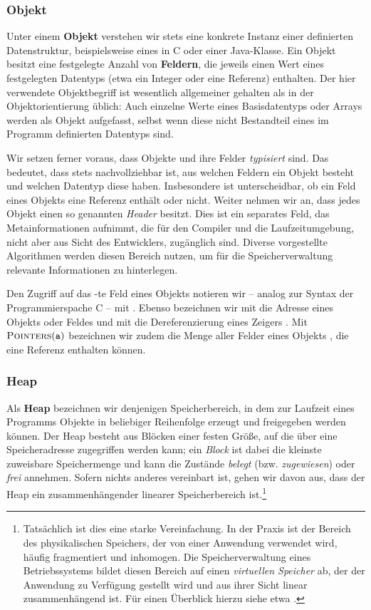 \subsubsection*{Objekt}
Unter einem \textbf{Objekt} verstehen wir stets eine konkrete Instanz einer definierten Datenstruktur, beispielsweise eines  in C oder einer Java-Klasse.
Ein Objekt besitzt eine festgelegte Anzahl von \textbf{Feldern}, die jeweils einen Wert eines festgelegten
Datentyps (etwa ein Integer oder eine Referenz) enthalten.
Der hier verwendete Objektbegriff ist wesentlich allgemeiner gehalten als in der Objektorientierung üblich:
Auch einzelne Werte eines Basisdatentyps oder Arrays werden als Objekt aufgefasst, selbst wenn diese nicht Bestandteil eines im Programm definierten Datentyps sind.

Wir setzen ferner voraus, dass Objekte und ihre Felder \textit{typisiert} sind.
Das bedeutet, dass stets nachvollziehbar ist, aus welchen Feldern ein Objekt besteht und welchen Datentyp diese haben.
Insbesondere ist unterscheidbar, ob ein Feld eines Objekts eine Referenz enthält oder nicht.
Weiter nehmen wir an, dass jedes Objekt einen so genannten \textit{Header} besitzt.
Dies ist ein separates Feld, das Metainformationen aufnimmt, die für den Compiler und die Laufzeitumgebung, nicht aber aus Sicht des Entwicklers, zugänglich sind.
Diverse vorgestellte Algorithmen werden diesen Bereich nutzen, um für die Speicherverwaltung relevante Informationen zu hinterlegen.

Den Zugriff auf das -te Feld eines Objekts  notieren wir -- analog zur Syntax der Programmierspache C -- mit .
Ebenso bezeichnen wir mit  die Adresse eines Objekts oder Feldes und mit  die Dereferenzierung eines Zeigers .
Mit $\textsc{Pointers}(\texttt{a})$ bezeichnen wir zudem die Menge aller Felder eines Objekts , die eine Referenz enthalten können.

\subsubsection*{Heap}
Als \textbf{Heap} bezeichnen wir denjenigen Speicherbereich, in dem zur Laufzeit eines Programms Objekte in beliebiger Reihenfolge erzeugt und freigegeben werden können.
Der Heap besteht aus Blöcken einer festen Größe, auf die über eine Speicheradresse zugegriffen werden kann; ein \textit{Block} ist dabei die kleinste zuweisbare Speichermenge und kann die Zustände \textit{belegt} (bzw. \textit{zugewiesen}) oder \textit{frei} annehmen.
Sofern nichts anderes vereinbart ist, gehen wir davon aus, dass der Heap ein zusammenhängender linearer Speicherbereich ist.\footnote{Tatsächlich ist dies eine starke Vereinfachung. In der Praxis ist der Bereich des physikalischen Speichers, der von einer Anwendung verwendet wird, häufig fragmentiert und inhomogen. Die Speicherverwaltung eines Betriebssystems bildet diesen Bereich auf einen \textit{virtuellen Speicher} ab, der der Anwendung zu Verfügung gestellt wird und aus ihrer Sicht linear zusammenhängend ist. Für einen Überblick hierzu siehe etwa \cite[Kap. 3.3]{tanenbaum}.}

